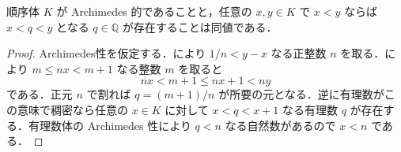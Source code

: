 \begin{prop}[Archimedes性と有理数の稠密性]
順序体 $K$ が Archimedes 的であることと，任意の $x,y\in K$ で $x<y$ ならば $x<q<y$ となる $q\in\mathbb Q$ が存在することは同値である．
\end{prop}
\begin{proof}
Archimedes性を仮定する．により $1/n<y-x$ なる正整数 $n$ を取る．により $m\leq nx<m+1$ なる整数 $m$ を取ると
\[
 nx<m+1\leq nx+1<ny
\]
である．正元 $n$ で割れば $q=(m+1)/n$ が所要の元となる．逆に有理数がこの意味で稠密なら任意の $x\in K$ に対して $x<q<x+1$ なる有理数 $q$ が存在する．有理数体の Archimedes 性により $q<n$ なる自然数があるので $x<n$ である．
\end{proof}
